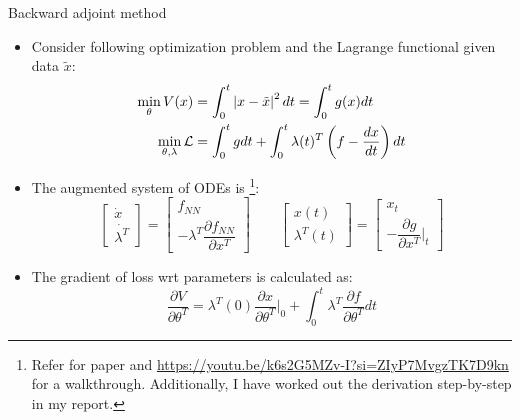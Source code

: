 \documentclass[dvipsnames, 9pt]{beamer}
\begin{document}
\begin{frame}{Backward adjoint method}
    \begin{itemize}
        \item Consider following optimization problem and the Lagrange functional given data $\tilde{x}$:
        \begin{align*}
            \min\limits_{\theta}V(x) &= \int_0^t \left| x - \tilde{x} \right|^2 dt = \int_0^t g(x)dt \notag \\
            \min\limits_{\theta, \lambda}\mathcal{L} &= \int_0^t g dt + \int_0^t \lambda(t)^T \left(f - \dfrac{dx}{dt}\right) dt
        \end{align*}
        \item The augmented system of ODEs is \footnote{Refer \cite{sengupta:friston:penny:2014} for paper and 
        \url{https://youtu.be/k6s2G5MZv-I?si=ZIyP7MvgzTK7D9kn} for a walkthrough. Additionally, 
        I have worked out the derivation step-by-step in my report.}:
        \[
        \begin{bmatrix} \dot{x} \\ \dot{\lambda^T} \end{bmatrix} = 
        \begin{bmatrix} f_{NN} \\ -\lambda^T \dfrac{\partial f_{NN}}{\partial x^T}\end{bmatrix}
        \qquad
        \begin{bmatrix} x(t) \\ \lambda^T(t) \end{bmatrix} =
        \begin{bmatrix} x_t \\ - \dfrac{\partial g}{\partial x^T}|_{t} \end{bmatrix}
        \label{eq:augsens}
        \]
        \item The gradient of loss wrt parameters is calculated as:
        \[
            \dfrac{\partial V}{\partial \theta^T} = \lambda^T(0)\dfrac{\partial x}{\partial \theta^T}|_0 + \int_0^t   \lambda^T \dfrac{\partial f}{\partial \theta^T} dt
        \]
    \end{itemize}
\end{frame}
\end{document}
